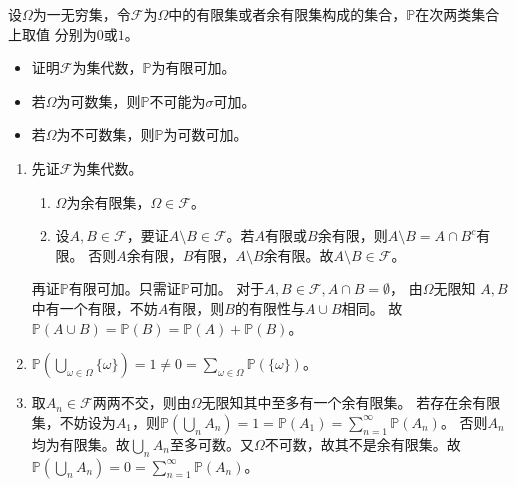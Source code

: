 \documentclass{ctexart}
\begin{document}
\begin{problem}
  设\(\Omega \)为一无穷集，令\(\mathcal{F} \)为\(\Omega \)中的有限集或者余有限集构成的集合，\(\mathbb{P} \)在次两类集合上取值
  分别为\(0 \)或\(1 \)。
  \begin{itemize}
    \item 证明\(\mathcal{F} \)为集代数，\(\mathbb{P} \)为有限可加。
    \item 若\(\Omega \)为可数集，则\(\mathbb{P} \)不可能为\(\sigma \)可加。
    \item 若\(\Omega \)为不可数集，则\(\mathbb{P} \)为可数可加。
  \end{itemize}

\end{problem}
\begin{solution}
  \begin{enumerate}
    \item
      先证\(\mathcal{F} \)为集代数。
      \begin{enumerate}
        \item \(\Omega \)为余有限集，\(\Omega \in \mathcal{F} \)。
        \item 设\(A,B \in \mathcal{F} \)，要证\(A \setminus B \in \mathcal{F} \)。若\(A \)有限或\(B \)余有限，则\(A \setminus B = A \cap B^c \)有限。
          否则\(A \)余有限，\(B \)有限，\(A \setminus B \)余有限。故\(A \setminus B \in \mathcal{F} \)。
      \end{enumerate}
      再证\(\mathbb{P}\)有限可加。只需证\(\mathbb{P} \)可加。
      对于\(A,B \in \mathcal{F},A \cap B = \emptyset \)，
      由\(\Omega \)无限知 \(A,B \)中有一个有限，不妨\(A \)有限，则\(B \)的有限性与\(A \cup B \)相同。
      故\(\mathbb{P}(A \cup B)=\mathbb{P}(B)=\mathbb{P}(A)+\mathbb{P}(B) \)。
    \item \(\mathbb{P}(\bigcup_{\omega \in \Omega}\{\omega\})=1 \neq 0 = \sum_{\omega \in \Omega}\mathbb{P}(\{\omega\}) \)。
    \item 取\(A_n \in \mathcal{F} \)两两不交，则由\(\Omega \)无限知其中至多有一个余有限集。
      若存在余有限集，不妨设为\(A_1 \)，则\(\mathbb{P}(\bigcup_{n}A_n)=1=\mathbb{P}(A_1)=\sum_{n=1}^{\infty}\mathbb{P}(A_n) \)。
      否则\(A_n \)均为有限集。故\(\bigcup_{n}A_n \)至多可数。又\(\Omega \)不可数，故其不是余有限集。故\(\mathbb{P}(\bigcup_{n}A_n)=0 = \sum_{n=1}^{\infty}\mathbb{P}(A_n) \)。
  \end{enumerate}

\end{solution}
\end{document}

